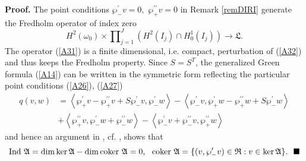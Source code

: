 \documentclass[11pt]{article}%
\numberwithin{equation}{section}
\begin{document}
\textbf{Proof. }The point conditions $\wp_{-}^{\prime}v=0,$ $\wp_{+}%
^{\prime\prime}v=0$ in Remark \ref{remDIRI} generate the Fredholm operator of
index zero%
\begin{equation}
H^{2}(\omega_{0})\times%
{\textstyle\prod\nolimits_{j=1}^{J}}
(H^{2}(I_{j})\cap H_{0}^{1}(I_{j}))\rightarrow\mathfrak{L}. \label{A32}%
\end{equation}
The operator (\ref{A31}) is a finite dimensional, i.e. compact, perturbation
of (\ref{A32}) and thus keeps the Fredholm property. Since $S=S^{T}$, the
generalized Green formula (\ref{A14}) can be written in the symmetric form
reflecting the particular point conditions (\ref{A26}), (\ref{A27})%
\begin{align}
q(v,w)  &  =\left\langle \wp_{+}^{\prime}v-\wp_{+}^{\prime\prime}v+S\wp
_{-}^{\prime}v,\wp_{-}^{\prime}w\right\rangle -\left\langle \wp_{-}^{\prime
}v,\wp_{+}^{\prime}w-\wp_{+}^{\prime\prime}w+S\wp_{-}^{\prime}w\right\rangle
\label{A33}\\
&  +\left\langle \wp_{+}^{\prime\prime}v,\wp_{-}^{\prime}w+\wp_{-}%
^{\prime\prime}w\right\rangle -\left\langle \wp_{-}^{\prime}v+\wp_{-}%
^{\prime\prime}v,\wp_{+}^{\prime\prime}w\right\rangle \nonumber
\end{align}
and hence an argument in \cite[Sect. 2.2.5, 2.5.3]{LiMa}, cf. \cite[\S 6.2]%
{NaPl}, shows that%
\begin{equation}
\mathrm{Ind~}\mathfrak{A}=\dim\ker\mathfrak{A}-\dim\text{\textrm{coker}%
}~\mathfrak{A}=0,\ \ \text{\textrm{coker}}~\mathfrak{A}=\{(v,\wp_{-}^{\prime
}v)\in\mathfrak{R}:v\in\ker\mathfrak{A}\}.\ \ \blacksquare\label{A333}%
\end{equation}
\end{document}
